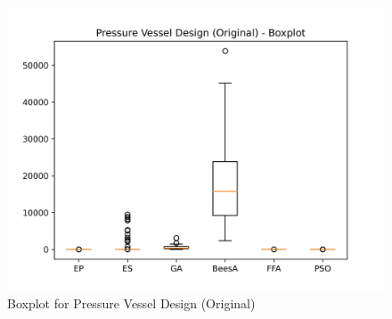 \begin{figure}[H]
\centering
\caption{Boxplot for Pressure Vessel Design (Original)}
\label{fig:pressure_vessel_design_original_boxplot}
\includegraphics[scale=0.5]{images/pressure_vessel_problem_original_boxplot.png}
\end{figure}
